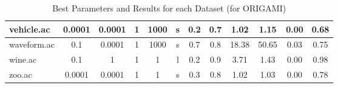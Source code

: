 \begin{table}[htbp]
\begin{tabular}{|l|c|c|c|c|c|c|c||c|c|c|c|}
		\hline
		vehicle.ac     & 0.0001   & 0.0001      & 1              & 1000                & s        & 0.2    & 0.7   & 1.02           & 1.15           & 0.00           & 0.68           \\
		\hline
		waveform.ac    & 0.1      & 0.0001      & 1              & 1000                & s        & 0.7    & 0.8   & 18.38          & 50.65          & 0.03           & 0.75           \\
		\hline
		wine.ac        & 0.1      & 1           & 1              & 1                   & l        & 0.2    & 0.9   & 3.71           & 1.43           & 0.00           & 0.98           \\
		\hline
		zoo.ac         & 0.0001   & 0.0001      & 1              & 1                   & s        & 0.3    & 0.8   & 1.02           & 1.03           & 0.00           & 0.78           \\
		\hline
		\end{tabular}
	\caption{Best Parameters and Results for each Dataset (for ORIGAMI)}
	\label{tab:best_runs_for_each_db_origami}
\end{table}
